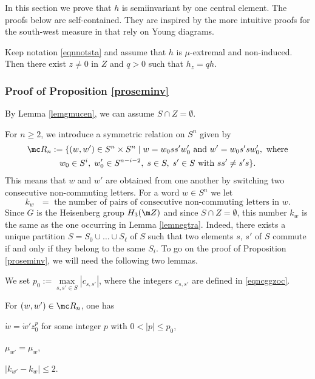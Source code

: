 \bq
In this section we prove that $h$
is semiinvariant by one central element.
The proofs below are self-contained.
They are inspired by the more intuitive
proofs for the south-west measure in \cite{BenoistHeisenberg1}
that rely on Young diagrams.
\eq

\begin{Prop}

\label{proseminv}
Keep notation \eqref{eqnnotsta} and
assume that $h$ is $\mu$-extremal and non-induced.
Then there exist $z\neq 0$ in $Z$ and $q>0$ such that $h_z=qh$.
\end{Prop}

\subsubsection*{Proof of Proposition \ref{proseminv}}
By Lemma \ref{lemgmucen}, we can assume $S\cap Z=\emptyset$.

For $n\geq 2$, we introduce a symmetric relation on $S^n$ given by
\begin{multline*}
\mc R_n:=\{ (w,w')\in S^n\times S^n \mid
w=w_0ss'w'_0\text{ and } w'=w_0s'sw'_0,\text{ where}\\
w_0\in S^i,\;w'_0\in S^{n-i-2},\; s\in S,\;s'\in S\text{ with } ss'\neq s's\}.
\end{multline*}
This means that $w$ and $w'$ are obtained from one another by switching two
consecutive non-commuting letters.
For a word $w\in S^n$ we let
\[
\text{$k_w$ $=$ the number of
pairs of consecutive non-commuting letters in $w$.}
\]
Since $G$ is the Heisenberg group $H_3(\m Z)$ and since $S\cap Z=\emptyset$,
this number
$k_w$ is the same as the one occurring in Lemma \ref{lemnegtra}.
Indeed, there exists a unique partition
$S=S_0\cup\ldots\cup S_\ell$ of $S$ such that two elements $s$, $s'$ of $S$
commute if and only if they belong to the same $S_i$.
To go on the proof of Proposition \ref{proseminv}, we will need the following two lemmas.

We set $p_0:=\max\limits_{s,s'\in S} |c_{s,s'}|$, where the integers $c_{s,s'}$
are defined in \eqref{eqncggzoc}.

\begin{Lem}
\label{lemkwkw}
For $(w,w')\in \mc R_n$, one has
\begin{enumeratei}
\item\label{lemkwkwi}
$\dot{w}=\dot{w}'z_0^p$ for some integer $p$ with $0<|p|\leq p_0$,
\item\label{lemkwkwii}
$\mu_{w'}=\mu_w$,
\item\label{lemkwkwiii}
$|k_{w'}-k_w|\leq 2$.
\end{enumeratei}
\end{Lem}

